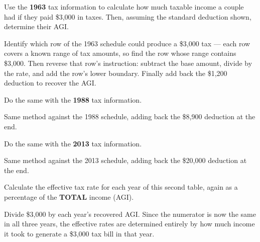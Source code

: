 \documentclass[12pt]{ximera}
\begin{document}
\begin{problem}
Use the \textbf{1963} tax information to calculate how much taxable income a couple had
if they paid \$3,000 in taxes. Then, assuming the standard deduction shown, determine
their AGI.

\showworkyear

\begin{freeResponse}
\end{freeResponse}

\begin{solution}
Identify which row of the 1963 schedule could produce a \$3,000 tax --- each row covers a
known range of tax amounts, so find the row whose range contains \$3,000. Then reverse
that row's instruction: subtract the base amount, divide by the rate, and add the row's
lower boundary. Finally add back the \$1,200 deduction to recover the AGI.
\end{solution}
\end{problem}

\begin{problem}
Do the same with the \textbf{1988} tax information.

\showworkyear

\begin{freeResponse}
\end{freeResponse}

\begin{solution}
Same method against the 1988 schedule, adding back the \$8,900 deduction at the end.
\end{solution}
\end{problem}

\begin{problem}
Do the same with the \textbf{2013} tax information.

\showworkyear

\begin{freeResponse}
\end{freeResponse}

\begin{solution}
Same method against the 2013 schedule, adding back the \$20,000 deduction at the end.
\end{solution}
\end{problem}

\begin{problem}
Calculate the effective tax rate for each year of this second table, again as a
percentage of the \textbf{TOTAL} income (AGI).

\begin{freeResponse}
\end{freeResponse}

\begin{solution}
Divide \$3,000 by each year's recovered AGI. Since the numerator is now the same in all
three years, the effective rates are determined entirely by how much income it took to
generate a \$3,000 tax bill in that year.
\end{solution}
\end{problem}
\end{document}
